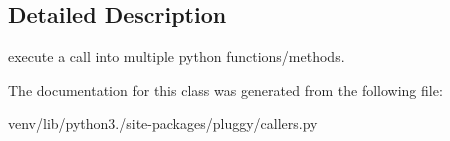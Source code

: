 \subsection{Detailed Description}
\begin{DoxyVerb}execute a call into multiple python functions/methods. \end{DoxyVerb}
 

The documentation for this class was generated from the following file\+:\begin{DoxyCompactItemize}
\item 
venv/lib/python3./site-\/packages/pluggy/callers.\+py\end{DoxyCompactItemize}
